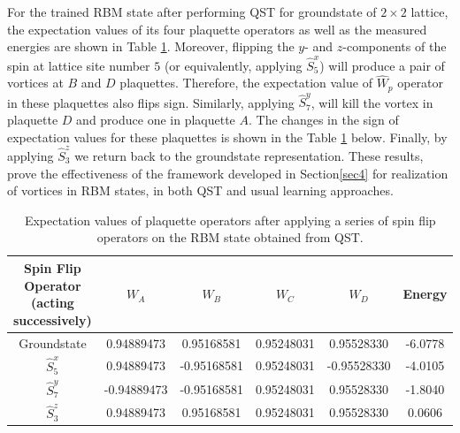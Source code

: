 \documentclass{article}
\begin{document}
For the trained RBM state after performing QST for groundstate of $2 \times 2$ lattice, the expectation values of its four plaquette operators as well as the measured energies are shown in Table \hspace{0.2mm}\ref{tab:pl0}. Moreover, flipping the $y$- and $z$-components of the spin at lattice site number $5$ (or equivalently, applying $\hat{S}_5^{x}$) will produce a pair of vortices at $B$ and $D$ plaquettes. Therefore, the expectation value of $\hat{W}_p$ operator in these plaquettes also flips sign. Similarly, applying $\hat{S}_7^{y}$, will kill the vortex in plaquette $D$ and produce one in plaquette $A$. The changes in the sign of expectation values for these plaquettes is shown in the Table \hspace{0.2mm}\ref{tab:pl0} below. Finally, by applying $\hat{S}_3^{z}$ we return back to the groundstate representation. These results, prove the effectiveness of the framework developed in Section\hspace{0.2mm}\ref{sec4} for realization of vortices in RBM states, in both QST and usual learning approaches.  

\begin{table}[!htb]
	\centering
	{
    \begin{tabular}{|c||c|c|c|c|c|}
    \hline
    Spin Flip Operator (acting successively)&$W_A$&$W_B$&$W_C$&$W_D$&Energy\\
    \hline \hline
    Groundstate&0.94889473&0.95168581&0.95248031&0.95528330&-6.0778\\
    \hline
    $\hat{S}_5^{x}$&0.94889473&-0.95168581&0.95248031&-0.95528330&-4.0105\\
    \hline
    $\hat{S}_7^{y}$&-0.94889473&-0.95168581&0.95248031&0.95528330&-1.8040\\
    \hline
    $\hat{S}_3^{z}$&0.94889473&0.95168581&0.95248031&0.95528330&0.0606\\
    \hline
    \end{tabular}}
	\vspace{2mm}
	\caption{\label{tab:pl0} Expectation values of plaquette operators after applying a series of spin flip operators on the RBM state obtained from QST.} 
\end{table}


\end{document}

